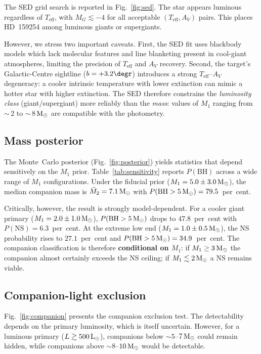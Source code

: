 \documentclass[usenatbib,fleqn]{mnras}
\newcommand{\Msun}{{\rm M}_\odot}
\newcommand{\Lsun}{{\rm L}_\odot}
\begin{document}
The SED grid search is reported in
Fig.~\ref{fig:sed}.  The star appears luminous regardless of
$T_\mathrm{eff}$, with $M_G \lesssim -4$ for all acceptable
$(T_\mathrm{eff}, A_V)$ pairs.  This places HD~159254 among
luminous giants or supergiants.

However, we stress two important caveats.  First, the SED fit
uses blackbody models which lack molecular features and line
blanketing present in cool-giant atmospheres, limiting the
precision of $T_\mathrm{eff}$ and $A_V$ recovery.  Second, the
target's Galactic-Centre sightline ($b = +3.2\degr$) introduces a
strong $T_\mathrm{eff}$--$A_V$ degeneracy: a cooler intrinsic
temperature with lower extinction can mimic a hotter star with
higher extinction.  The SED therefore constrains the \emph{luminosity class} (giant/supergiant) more reliably than the
\emph{mass}: values of $M_1$ ranging from $\sim$\,2 to
$\sim$\,8\,$\Msun$ are compatible with the photometry.

\subsection{Mass posterior}
\label{sec:results:posterior}

The Monte~Carlo posterior (Fig.~\ref{fig:posterior}) yields
statistics that depend sensitively on the $M_1$ prior.
Table~\ref{tab:sensitivity} reports $P(\text{BH})$ across a wide
range of $M_1$ configurations.  Under the fiducial prior ($M_1 =
5.0 \pm 3.0\,\Msun$), the median companion mass is
$\tilde{M}_2 = 7.1\,\Msun$ with $P(\text{BH} > 5\,\Msun) =
79.5$~per~cent.

Critically, however, the result is strongly model-dependent.
For a cooler giant primary ($M_1 = 2.0 \pm 1.0\,\Msun$),
$P(\text{BH} > 5\,\Msun)$ drops to $47.8$~per~cent with
$P(\text{NS}) = 6.3$~per~cent.  At the extreme low end
($M_1 = 1.0 \pm 0.5\,\Msun$), the NS probability rises to
$27.1$~per~cent and $P(\text{BH} > 5\,\Msun) = 34.9$~per~cent.
The companion classification is therefore \textbf{conditional on
$M_1$}: if $M_1 \ge 3\,\Msun$ the companion almost certainly
exceeds the NS ceiling; if $M_1 \lesssim 2\,\Msun$ a NS
remains viable.

\subsection{Companion-light exclusion}
\label{sec:results:companion}

Fig.~\ref{fig:companion} presents the companion exclusion test.
The detectability depends on the primary luminosity, which is
itself uncertain.  However, for a luminous primary
($L \gtrsim 500\,\Lsun$), companions below $\sim
5$--$7\,\Msun$ could remain hidden, while companions above
$\sim 8$--$10\,\Msun$ would be detectable.
\end{document}
